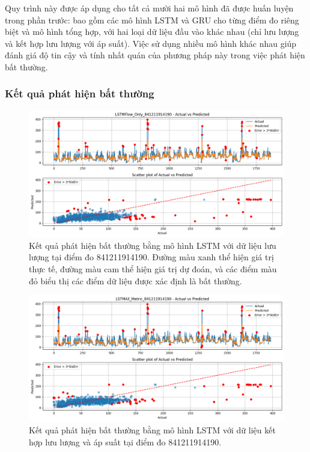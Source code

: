 Quy trình này được áp dụng cho tất cả mười hai mô hình đã được huấn luyện trong phần trước: bao gồm các mô hình LSTM và GRU cho từng điểm đo riêng biệt và mô hình tổng hợp, với hai loại dữ liệu đầu vào khác nhau (chỉ lưu lượng và kết hợp lưu lượng với áp suất). Việc sử dụng nhiều mô hình khác nhau giúp đánh giá độ tin cậy và tính nhất quán của phương pháp này trong việc phát hiện bất thường.

\subsubsection{Kết quả phát hiện bất thường}

\begin{figure}[H]
    \centering
    \includegraphics[width=\textwidth]{image/section6_3/anomaly_detection_841211914190_lstm_flow.png}
    \caption{Kết quả phát hiện bất thường bằng mô hình LSTM với dữ liệu lưu lượng tại điểm đo 841211914190. Đường màu xanh thể hiện giá trị thực tế, đường màu cam thể hiện giá trị dự đoán, và các điểm màu đỏ biểu thị các điểm dữ liệu được xác định là bất thường.}
    \label{fig:anomaly_lstm_841211914190_flow}
\end{figure}

\begin{figure}[H]
    \centering
    \includegraphics[width=\textwidth]{image/section6_3/anomaly_detection_841211914190_lstm_allmetric.png}
    \caption{Kết quả phát hiện bất thường bằng mô hình LSTM với dữ liệu kết hợp lưu lượng và áp suất tại điểm đo 841211914190.}
    \label{fig:anomaly_lstm_841211914190_all}
\end{figure}

